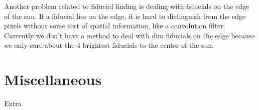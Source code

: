 \documentclass[10pt]{scrartcl}
\begin{document}
Another problem related to fiducial finding is dealing with fiducials on the edge of the sun. If a fiducial lies on the edge, it is hard to distinguish from the edge pixels without some sort of spatial information, like a convolution filter. Currently we don't have a method to deal with dim fiducials on the edge because we only care about the 4 brightest fiducials to the center of the sun. 


\section{Miscellaneous} %
\label{sec:miscellaneous}
Extra
\end{document}
